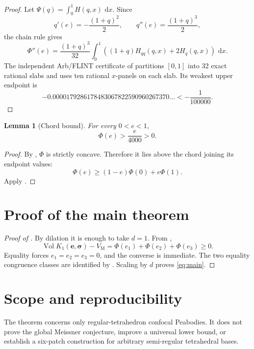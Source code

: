 \documentclass[11pt]{article}
\numberwithin{equation}{section}
\newtheorem{lemma}[theorem]{Lemma}
\theoremstyle{remark}
\newcommand{\Vol}{\operatorname{Vol}}
\newcommand{\dd}{\,\mathrm d}
\newcommand{\VM}{V_{\mathrm M}}
\begin{document}
\begin{proof}
Let \(\Psi(q)=\int_0^1H(q,x)\,\dd x\).  Since
\[
  q'(e)=-\frac{(1+q)^2}{2},
  \qquad
  q''(e)=\frac{(1+q)^3}{2},
\]
the chain rule gives
\begin{equation}
  \Phi''(e)=\frac{(1+q)^3}{32}
  \int_0^1\left((1+q)H_{qq}(q,x)+2H_q(q,x)\right)\,\dd x.
  \label{eq:concavity-identity}
\end{equation}
The independent Arb/FLINT certificate of  partitions \([0,1]\) into 32 exact rational slabs and uses ten rational \(x\)-panels on each slab.  Its weakest upper endpoint is
\[
  -0.0000179286178483067822590960267370\ldots
  <-\frac1{100000}.
\]
\end{proof}

\begin{lemma}[Chord bound]
\label{lem:chord}
For every \(0<e<1\),
\begin{equation}
  \Phi(e)>\frac e{4000}>0.
  \label{eq:chord-bound}
\end{equation}
\end{lemma}

\begin{proof}
By , \(\Phi\) is strictly concave.  Therefore it lies above the chord joining its endpoint values:
\[
  \Phi(e)\ge(1-e)\Phi(0)+e\Phi(1).
\]
Apply .
\end{proof}

\section{Proof of the main theorem}

\begin{proof}[Proof of ]
By dilation it is enough to take \(d=1\).  From ,
\[
  \Vol K_1(\mathbf e,\boldsymbol\sigma)-\VM
  =\Phi(e_1)+\Phi(e_2)+\Phi(e_3)\ge0.
\]
Equality forces \(e_1=e_2=e_3=0\), and the converse is immediate.  The two equality congruence classes are identified by .  Scaling by \(d\) proves \eqref{eq:main}.
\end{proof}

\section{Scope and reproducibility}

The theorem concerns only regular-tetrahedron confocal Peabodies.  It does not prove the global Meissner conjecture, improve a universal lower bound, or establish a six-patch construction for arbitrary semi-regular tetrahedral bases.
\end{document}
